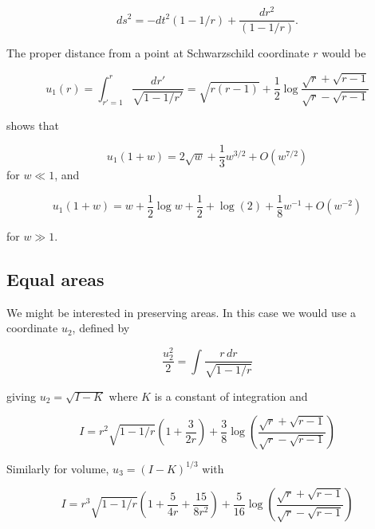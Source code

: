 \documentclass{article}
\begin{document}
\begin{equation}
  ds^2=-dt^2\left(1-1/r\right)
  +\frac{dr^2}{\left(1-1/r\right)}.
\end{equation}

The proper distance from a point at Schwarzschild coordinate $r$ would be

\begin{equation}
  u_1(r)=
  \int_{r'=1}^r\frac{dr'}{\sqrt{1-1/r'}}=
  \sqrt{r(r-1)} + \frac{1}{2}\log\frac{\sqrt{r}+\sqrt{r-1}}{\sqrt{r}-\sqrt{r-1}}
  \end{equation}

\cite{hankin2021} shows that



\begin{equation}
  u_1(1+w)=2\sqrt{w} + \frac{1}{3}w^{3/2} + O(w^{7/2})
\end{equation}
for $w\ll 1$, and 

\begin{equation}
  u_1(1+w)=w + \frac{1}{2}\log w + \frac{1}{2} +
  \log(2) + \frac{1}{8}w^{-1} + O(w^{-2})
\end{equation}

for $w\gg 1$.

\subsection{Equal areas}

We might be interested in preserving areas.  In this case we would use
a coordinate $u_2$, defined by

\begin{equation}
  \frac{u_2^2}{2}=\int\frac{r\,dr}{\sqrt{1-1/r}}
\end{equation}

giving $u_2=\sqrt{I-K}$ where $K$ is a constant of integration and

\begin{equation}
    I = r^2\sqrt{1-{1}/{r}}\left(1+\frac{3}{2r}\right)
 + \frac{3}{8}\log\left(\frac{\sqrt{r}+\sqrt{r-1}}{\sqrt{r}-\sqrt{r-1}}\right)
\end{equation}

Similarly for volume, $u_3=(I-K)^{1/3}$ with 

\begin{equation}
    I = r^3\sqrt{1-{1}/{r}}\left(1+\frac{5}{4r} + \frac{15}{8r^2}\right)
+ \frac{5}{16}\log\left(\frac{\sqrt{r}+\sqrt{r-1}}{\sqrt{r}-\sqrt{r-1}}\right)
\end{equation}
\end{document}
